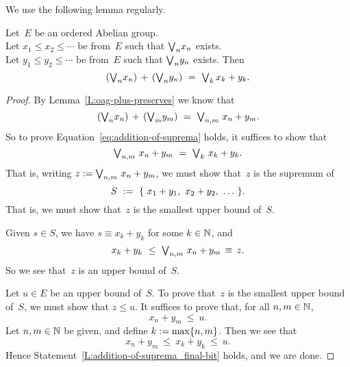 \noindent
We use the following
lemma
regularly.
%
%
\begin{lem}
\label{L:addition-of-suprema}
Let~$E$ be an ordered Abelian group.\\
Let $x_1 \leq x_2 \leq \dotsb$
be from~$E$ such that $\textstyle{\bigvee}_n x_n$ exists.\\
Let $y_1 \leq y_2 \leq \dotsb$
be from~$E$ such that $\textstyle{\bigvee}_n y_n$ exists.
Then
\begin{equation}
\label{eq:addition-of-suprema}
(\bv_n x_n) \,+\, (\bv_n y_n)
\ =\ 
\bv_k\, x_k + y_k.
\end{equation}
\end{lem}
\begin{proof}
By Lemma~\ref{L:oag-plus-preserves}
we know that 
\begin{equation*}
(\bv_n x_n) \,+\, (\bv_m y_m) \ =\  \bv_{n,m}\ x_n + y_m.
\end{equation*}
So to prove Equation~\eqref{eq:addition-of-suprema} holds,
it suffices to show that 
\begin{equation*}
\bv_{n,m}\ x_n + y_m \ =\ \bv_k \ x_k + y_k.
\end{equation*}
That is,
writing $z:= \textstyle{\bigvee}_{n,m}\ x_n + y_m$,
we must show that~$z$ is the supremum of 
\begin{equation*}
S \ \eqdf\ \{\ x_1+y_1,\ x_2 + y_2,\  \dotsc \ \}.
\end{equation*}
That is,
we must show that~$z$ is the smallest upper bound of~$S$.

Given $s\in S$, we have $s\equiv x_k + y_k$ for some  $k\in \mathbb{N}$,
and 
\begin{equation*}
x_k + y_k \ \leq\  \textstyle{\bigvee}_{n,m}\ x_n + y_m\,\equiv\, z.
\end{equation*}
So we see that~$z$ is an upper bound of~$S$.

Let $u\in E$ be an upper bound of~$S$.
To prove that~$z$ is the smallest upper bound
of~$S$, we must show that $z\leq u$.
It suffices to prove that,
for all $n,m\in \mathbb{N}$,
\begin{equation}
\label{L:addition-of-suprema_final-bit}
x_n + y_m \ \leq \ u.
\end{equation}
Let $n,m\in\mathbb{N}$ be given,
and define  $k:= \max\{n,m\}$.
Then we see that
\begin{equation*}
x_n + y_m \ \leq\  x_k + y_k \ \leq\  u.
\end{equation*}
Hence Statement~\eqref{L:addition-of-suprema_final-bit}
holds,
and we are done.
\end{proof}
